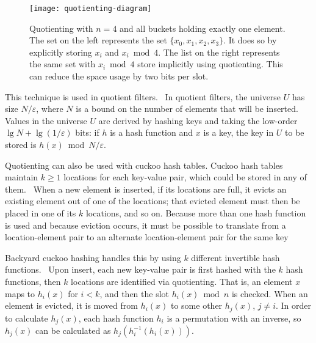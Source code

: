 \documentclass[sigconf, nonacm]{acmart}
\begin{document}
\begin{figure}
\texttt{[image: quotienting-diagram]}
\caption{\label{quotienting-figure}
Quotienting with $n=4$ and all buckets holding exactly one element.
The set on the left represents the set $\{x_0, x_1, x_2, x_3\}$.
It does so by explicitly storing $x_i$ and $x_i \bmod 4$.
The list on the right represents the same set with $x_i \bmod 4$ store implicitly using quotienting.
This can reduce the space usage by two bits per slot.
}
\end{figure}

This technique is used in quotient filters.~\cite{quotient-filter}
In quotient filters, the universe $U$ has size $N/\varepsilon$, where $N$ is a bound on the number of elements that will be inserted.
Values in the universe $U$ are derived by hashing keys and taking the low-order $\lg N + \lg (1/\varepsilon)$ bits: if $h$ is a hash function and $x$ is a key, the key in $U$ to be stored is $h(x) \bmod N/\varepsilon$.

Quotienting can also be used with cuckoo hash tables.
Cuckoo hash tables maintain $k \ge 1$ locations for each key-value pair, which could be stored in any of them.~\cite{cuckoo-journal}
When a new element is inserted, if its locations are full, it evicts an existing element out of one of the locations; that evicted element must then be placed in one of its $k$ locations, and so on.
Because more than one hash function is used and because eviction occurs, it must be possible to translate from a location-element pair to an alternate location-element pair for the same key



Backyard cuckoo hashing handles this by using $k$ different invertible hash functions.~\cite{backyard}
Upon insert, each new key-value pair is first hashed with the $k$ hash functions, then $k$ locations are identified via quotienting.
That is, an element $x$ maps to $h_i(x)$ for $i < k$, and then the slot $h_i(x) \bmod n$ is checked.
When an element is evicted, it is moved from $h_i(x)$ to some other $h_j(x)$, $j \ne i$.
In order to calculate $h_j(x)$, each hash function $h_i$ is a permutation with an inverse, so $h_j(x)$ can be calculated as $h_j(h_i^{-1}(h_i(x)))$.
\end{document}

